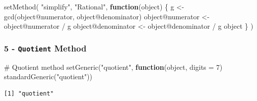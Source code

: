\documentclass[
  12pt,
]{article}
\newenvironment{Shaded}{\begin{snugshade}}{\end{snugshade}}
\newcommand{\AttributeTok}[1]{\textcolor[rgb]{0.40,0.45,0.13}{#1}}
\newcommand{\CommentTok}[1]{\textcolor[rgb]{0.37,0.37,0.37}{#1}}
\newcommand{\ControlFlowTok}[1]{\textcolor[rgb]{0.00,0.23,0.31}{\textbf{#1}}}
\newcommand{\DecValTok}[1]{\textcolor[rgb]{0.68,0.00,0.00}{#1}}
\newcommand{\FunctionTok}[1]{\textcolor[rgb]{0.28,0.35,0.67}{#1}}
\newcommand{\NormalTok}[1]{\textcolor[rgb]{0.00,0.23,0.31}{#1}}
\newcommand{\OtherTok}[1]{\textcolor[rgb]{0.00,0.23,0.31}{#1}}
\newcommand{\SpecialCharTok}[1]{\textcolor[rgb]{0.37,0.37,0.37}{#1}}
\newcommand{\StringTok}[1]{\textcolor[rgb]{0.13,0.47,0.30}{#1}}
\begin{document}
\begin{Shaded}
\begin{Highlighting}[]
\FunctionTok{setMethod}\NormalTok{(}
  \StringTok{"simplify"}\NormalTok{,}
  \StringTok{"Rational"}\NormalTok{,}
  \ControlFlowTok{function}\NormalTok{(object) \{}
\NormalTok{    g }\OtherTok{\textless{}{-}} \FunctionTok{gcd}\NormalTok{(object}\SpecialCharTok{@}\NormalTok{numerator, object}\SpecialCharTok{@}\NormalTok{denominator)}
\NormalTok{    object}\SpecialCharTok{@}\NormalTok{numerator }\OtherTok{\textless{}{-}}\NormalTok{ object}\SpecialCharTok{@}\NormalTok{numerator }\SpecialCharTok{/}\NormalTok{ g}
\NormalTok{    object}\SpecialCharTok{@}\NormalTok{denominator }\OtherTok{\textless{}{-}}\NormalTok{ object}\SpecialCharTok{@}\NormalTok{denominator }\SpecialCharTok{/}\NormalTok{ g}
\NormalTok{    object}
\NormalTok{  \}}
\NormalTok{)}
\end{Highlighting}
\end{Shaded}

\subsubsection{\texorpdfstring{5 - \texttt{Quotient}
Method}{5 - Quotient Method}}\label{quotient-method}

\begin{Shaded}
\begin{Highlighting}[]
\CommentTok{\# Quotient method}
\FunctionTok{setGeneric}\NormalTok{(}\StringTok{"quotient"}\NormalTok{, }\ControlFlowTok{function}\NormalTok{(object, }\AttributeTok{digits =} \DecValTok{7}\NormalTok{) }\FunctionTok{standardGeneric}\NormalTok{(}\StringTok{"quotient"}\NormalTok{))}
\end{Highlighting}
\end{Shaded}

\begin{verbatim}
[1] "quotient"
\end{verbatim}
\end{document}
